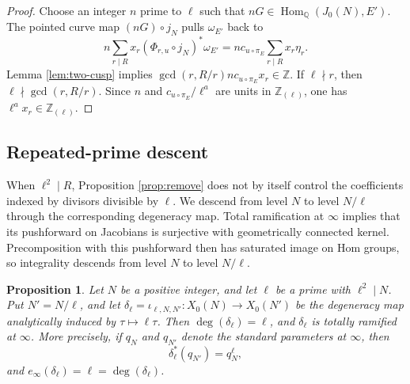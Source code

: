\documentclass[12pt, letterpaper]{amsart}
\newtheorem{proposition}[theorem]{Proposition}
\theoremstyle{definition}
\theoremstyle{remark}
\newcommand{\Q}{\mathbb Q}
\newcommand{\Z}{\mathbb Z}
\newcommand{\Hom}{\operatorname{Hom}}
\numberwithin{equation}{section}
\begin{document}
\begin{proof}
Choose an integer \(n\) prime to \(\ell\) such that
\(nG\in\Hom_\Q(J_0(N),E')\). The pointed curve map \((nG)\circ j_N\) pulls
\(\omega_{E'}\) back to
\[
        n\sum_{r\mid R}x_r(\Phi_{r,u}\circ j_N)^*\omega_{E'}
        =
        nc_{u\circ\pi_E}\sum_{r\mid R}x_r\eta_r .
\]
Lemma \ref{lem:two-cusp} implies
\(\gcd(r,R/r)nc_{u\circ\pi_E}x_r\in\Z\). If \(\ell\nmid r\), then
\(\ell\nmid\gcd(r,R/r)\). Since \(n\) and \(c_{u\circ\pi_E}/\ell^a\) are units in
\(\Z_{(\ell)}\), one has \(\ell^ax_r\in\Z_{(\ell)}\).
\end{proof}

\subsection{Repeated-prime descent}

When \(\ell^2\mid R\), Proposition \ref{prop:remove} does not by itself control
the coefficients indexed by divisors divisible by \(\ell\). We descend from
level \(N\) to level \(N/\ell\) through the corresponding degeneracy map.
Total ramification at \(\infty\) implies that its pushforward on Jacobians is
surjective with geometrically connected kernel. Precomposition with this
pushforward then has saturated image on Hom groups, so integrality descends
from level \(N\) to level \(N/\ell\).

\begin{proposition}\label{prop:degeneracy-degree-ramification}
Let \(N\) be a positive integer, and let \(\ell\) be a prime with
\(\ell^2\mid N\). Put \(N'=N/\ell\), and let
\(\delta_\ell=\iota_{\ell,N,N'}:X_0(N)\to X_0(N')\) be the degeneracy map
analytically induced by \(\tau\mapsto \ell\tau\).
Then \(\deg(\delta_\ell)=\ell\), and \(\delta_\ell\) is totally ramified at
\(\infty\). More
precisely, if \(q_N\) and \(q_{N'}\) denote the standard parameters at
\(\infty\), then
\begin{equation}\label{eq:q-total-ramification}
        \delta_\ell^*(q_{N'})=q_N^\ell,
\end{equation}
and \(e_\infty(\delta_\ell)=\ell=\deg(\delta_\ell)\).
\end{proposition}
\end{document}
